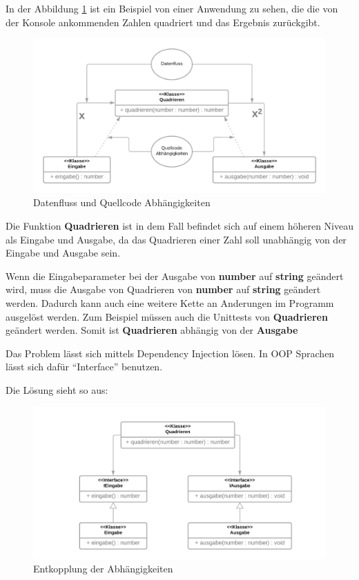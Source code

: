 In der Abbildung \ref{fig:dateflowVScodedep} ist ein Beispiel von einer Anwendung zu sehen, die die von der Konsole ankommenden Zahlen quadriert und das Ergebnis zurückgibt.
                
\begin{figure}[H]
    \centering
    \includegraphics[width=1\textwidth]{./images/DepInj_1.png}
    \caption{Datenfluss und Quellcode Abhängigkeiten}
    \label{fig:dateflowVScodedep}
\end{figure}

Die Funktion \textbf{Quadrieren} ist in dem Fall befindet sich auf einem höheren Niveau als Eingabe und Ausgabe, 
da das Quadrieren einer Zahl soll unabhängig von der Eingabe und Ausgabe sein.

Wenn die Eingabeparameter bei der Ausgabe von \textbf{number} auf \textbf{string} geändert wird, 
muss die Ausgabe von Quadrieren von \textbf{number} auf \textbf{string} geändert werden.
Dadurch kann auch eine weitere Kette an Anderungen im Programm ausgelöst werden. 
Zum Beispiel müssen auch die Unittests von \textbf{Quadrieren} geändert werden.
Somit ist \textbf{Quadrieren} abhängig von der \textbf{Ausgabe}

Das Problem lässt sich mittels Dependency Injection lösen.
In OOP Sprachen lässt sich dafür ``Interface'' benutzen.

Die Lösung sieht so aus: 
\begin{figure}[H]
    \centering
    \includegraphics[width=1\textwidth]{./images/DepInj_2.png}
    \caption{Entkopplung der Abhängigkeiten}
    \label{fig:flow around cylinder}
\end{figure}

